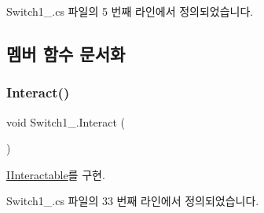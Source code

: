 Switch1\+\_.\+cs 파일의 5 번째 라인에서 정의되었습니다.



\subsection{멤버 함수 문서화}
\mbox{\label{class_switch1__1_a7a6f57395627e79c54aadef96b614673}} 
\subsubsection{\texorpdfstring{Interact()}{Interact()}}
{\footnotesize\ttfamily void Switch1\+\_.\+Interact (\begin{DoxyParamCaption}{ }\end{DoxyParamCaption})}



\mbox{\hyperlink{interface_i_interactable_a6e8c9bc1f27bc2a5c81f674ceeac024c}{I\+Interactable}}를 구현.



Switch1\+\_.\+cs 파일의 33 번째 라인에서 정의되었습니다.


